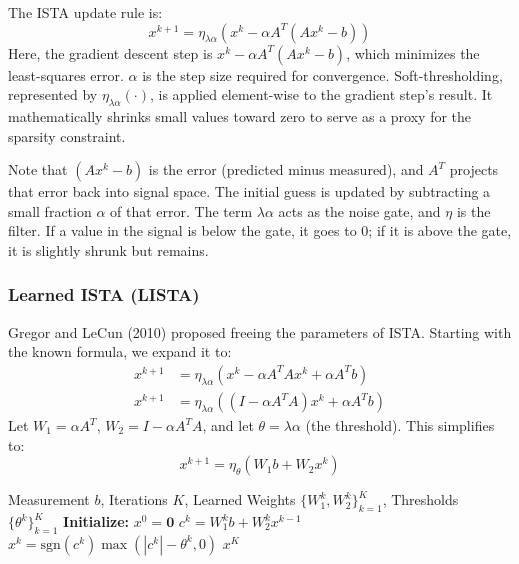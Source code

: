 \documentclass[conference]{IEEEtran}
\begin{document}
The ISTA update rule is:
\begin{equation}
x^{k+1} = \eta_{\lambda\alpha} (x^k - \alpha A^T (Ax^k - b))
\end{equation}
Here, the gradient descent step is $x^k - \alpha A^T(Ax^k - b)$, which minimizes the least-squares error. $\alpha$ is the step size required for convergence. Soft-thresholding, represented by $\eta_{\lambda\alpha}(\cdot)$, is applied element-wise to the gradient step's result. It mathematically shrinks small values toward zero to serve as a proxy for the sparsity constraint.

Note that $(Ax^k - b)$ is the error (predicted minus measured), and $A^T$ projects that error back into signal space. The initial guess is updated by subtracting a small fraction $\alpha$ of that error. The term $\lambda\alpha$ acts as the noise gate, and $\eta$ is the filter. If a value in the signal is below the gate, it goes to 0; if it is above the gate, it is slightly shrunk but remains.

\subsubsection{Learned ISTA (LISTA)}
Gregor and LeCun (2010) \cite{gregor2010learning} proposed freeing the parameters of ISTA. Starting with the known formula, we expand it to:
\begin{align}
x^{k+1} &= \eta_{\lambda\alpha} (x^k - \alpha A^T A x^k + \alpha A^T b) \\
x^{k+1} &= \eta_{\lambda\alpha} ((I - \alpha A^T A)x^k  + \alpha A^T b)
\end{align}
Let $W_1 = \alpha A^T$, $W_2 = I - \alpha A^T A$, and let $\theta = \lambda\alpha$ (the threshold). This simplifies to:
\begin{equation}
x^{k+1} = \eta_\theta(W_1 b + W_2 x^k)
\end{equation}

\begin{algorithm}[htbp]
\caption{Forward Pass of the Unrolled LISTA Network}
\label{alg:lista}
\begin{algorithmic}[1]
\REQUIRE Measurement $b$, Iterations $K$, Learned Weights $\{W_1^k, W_2^k\}_{k=1}^K$, Thresholds $\{\theta^k\}_{k=1}^K$
\STATE \textbf{Initialize:} $x^0 = \mathbf{0}$
    \STATE $c^k = W_1^k b + W_2^k x^{k-1}$
    \STATE $x^k = \text{sgn}(c^k) \max(|c^k| - \theta^k, 0)$
\ENDFOR
\RETURN $x^K$
\end{algorithmic}
\end{algorithm}
\end{document}
